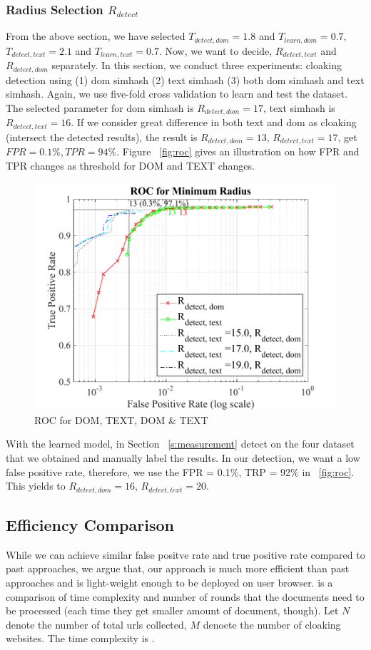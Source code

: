\subsubsection{Radius Selection $R_{detect}$}
From the above section, we have selected $T_{detect, dom} = 1.8$ and $T_{learn, dom} = 0.7$,
$T_{detect, text} = 2.1$ and $T_{learn, text} = 0.7$. Now, we want to decide,
$R_{detect, text}$ and $R_{detect, dom}$ separately. In this section, we conduct
three experiments: cloaking detection using (1) dom simhash (2) text simhash (3)
both dom simhash and text simhash.
Again, we use five-fold cross validation to learn and test the dataset. The
selected parameter for dom simhash is $R_{detect, dom} = 17$, text simhash is
$R_{detect, text} = 16$. If we consider great difference in both text and dom as
cloaking (intersect the detected results), the result is $R_{detect, dom} = 13$,
$R_{detect, text} = 17$, get $FPR = 0.1\%, TPR = 94\%$.
Figure ~\autoref{fig:roc} gives an illustration on how FPR and TPR changes as
threshold for DOM and TEXT changes.

\begin{figure}[t]
  \centering
  \includegraphics[width=.5\textwidth]{fig/roc}
  \caption{ROC for DOM, TEXT, DOM \& TEXT}
  \label{fig:roc}
\end{figure}

With the learned model, in Section ~\autoref{s:measurement} 
detect on the four dataset that we obtained and
manually label the results. In our detection, we want a low false positive rate,
therefore, we use the FPR = 0.1\%, TRP = 92\% in ~\autoref{fig:roc}. This yields
to $R_{detect, dom} = 16$, $R_{detect, text} = 20$.


\subsection{Efficiency Comparison}
While we can achieve similar false positve rate and true positive rate compared
to past approaches, we argue that, our approach is much more efficient than past
approaches and is light-weight enough to be deployed on user browser.
 is a comparison of time complexity and number of rounds that the
documents need to be processed (each time they get smaller amount of document,
though). Let $N$ denote the number of total urls collected, $M$ denoete the
number of cloaking websites. The time complexity is .

